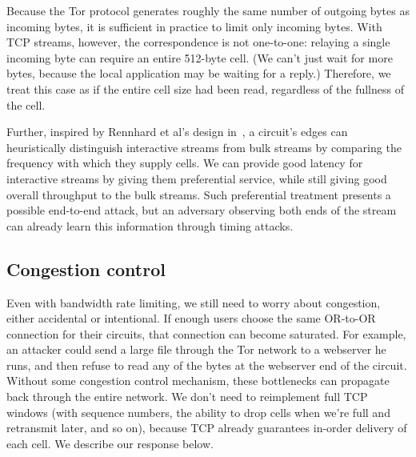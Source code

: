 \documentclass[twocolumn]{article}
\begin{document}

Because the Tor protocol generates roughly the same number of outgoing
bytes as incoming bytes, it is sufficient in practice to limit only
incoming bytes.
With TCP streams, however, the correspondence is not one-to-one:
relaying a single incoming byte can require an entire 512-byte cell.
(We can't just wait for more bytes, because the local application may
be waiting for a reply.) Therefore, we treat this case as if the entire
cell size had been read, regardless of the fullness of the cell.

Further, inspired by Rennhard et al's design in~\cite{anonnet}, a
circuit's edges can heuristically distinguish interactive streams from bulk
streams by comparing the frequency with which they supply cells.  We can
provide good latency for interactive streams by giving them preferential
service, while still giving good overall throughput to the bulk
streams. Such preferential treatment presents a possible end-to-end
attack, but an adversary observing both
ends of the stream can already learn this information through timing
attacks.

\subsection{Congestion control}
\label{subsec:congestion}

Even with bandwidth rate limiting, we still need to worry about
congestion, either accidental or intentional. If enough users choose the
same OR-to-OR connection for their circuits, that connection can become
saturated. For example, an attacker could send a large file
through the Tor network to a webserver he runs, and then
refuse to read any of the bytes at the webserver end of the
circuit. Without some congestion control mechanism, these bottlenecks
can propagate back through the entire network. We don't need to
reimplement full TCP windows (with sequence numbers,
the ability to drop cells when we're full and retransmit later, and so
on),
because TCP already guarantees in-order delivery of each
cell.
We describe our response below.
\end{document}
